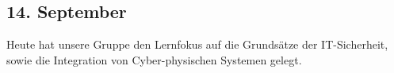 \subsection{14. September}
Heute hat unsere Gruppe den Lernfokus auf die Grundsätze der IT-Sicherheit, sowie die Integration von Cyber-physischen Systemen gelegt.